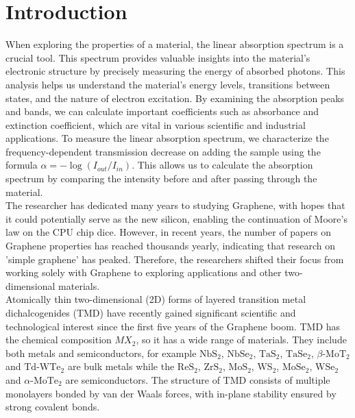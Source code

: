 \documentclass[12pt,english,a4paper]{article}
\begin{document}
	\section{Introduction}
\quad When exploring the properties of a material, the linear absorption spectrum is a crucial tool. This spectrum provides valuable insights into the material's electronic structure by precisely measuring the energy of absorbed photons. This analysis helps us understand the material's energy levels, transitions between states, and the nature of electron excitation. By examining the absorption peaks and bands, we can calculate important coefficients such as absorbance and extinction coefficient, which are vital in various scientific and industrial applications. To measure the linear absorption spectrum, we characterize the frequency-dependent transmission decrease on adding the sample using the formula $\alpha = -\log(I_{out}/I_{in})$. This allows us to calculate the absorption spectrum by comparing the intensity before and after passing through the material.\\\null
\quad  The researcher has dedicated many years to studying Graphene, with hopes that it could potentially serve as the new silicon, enabling the continuation of Moore's law on the CPU chip dice. However, in recent years, the number of papers on Graphene properties has reached thousands yearly, indicating that research on 'simple graphene' has peaked. \cite{geim_van_2013} Therefore, the researchers shifted their focus from working solely with Graphene to exploring applications and other two-dimensional materials. \\\null
\quad Atomically thin two-dimensional (2D) forms of layered transition metal dichalcogenides (TMD) have recently gained significant scientific and technological interest since the first five years of the Graphene boom.\cite{wang_electronics_2012,geim_van_2013} TMD has the chemical composition $MX_2$, so it has a wide range of materials. They include both metals and semiconductors, for example $\mathrm{NbS}_2$, $\mathrm{NbSe}_2$, $\mathrm{TaS}_2$, $\mathrm{TaSe}_2$, $\beta$-$\mathrm{MoT}_2$ and $\mathrm{Td}$-$\mathrm{WTe}_2$ are bulk metals while the $\mathrm{ReS}_2$, $\mathrm{ZrS}_2$, $\mathrm{MoS}_2$, $\mathrm{WS}_2$, $\mathrm{MoSe}_2$, $\mathrm{WSe}_2$ and $\alpha$-$\mathrm{MoTe}_2$ are semiconductors. The structure of TMD consists of multiple monolayers bonded by van der Waals forces, with in-plane stability ensured by strong covalent bonds.
\end{document}
